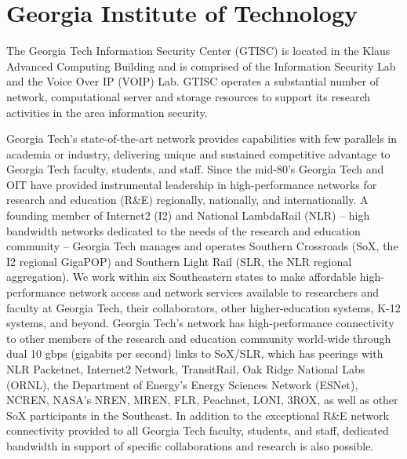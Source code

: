 \documentclass[letterpaper,11pt]{scrartcl}
\begin{document}
\section*{Georgia Institute of Technology}

The Georgia Tech Information Security Center (GTISC) is located in the Klaus
Advanced Computing Building and is comprised of the Information Security Lab
and the Voice Over IP (VOIP) Lab.  GTISC operates a substantial number of
network, computational server and storage resources  to support its research
activities in the area information security.

Georgia Tech's state-of-the-art network provides capabilities with few
parallels in academia or industry, delivering unique and sustained competitive
advantage to Georgia Tech faculty, students, and staff. Since the mid-80’s
Georgia Tech and OIT have provided instrumental leadership in high-performance
networks for research and education (R\&E) regionally, nationally, and
internationally.  A founding member of Internet2 (I2) and National LambdaRail
(NLR) – high bandwidth networks dedicated to the needs of the research and
education community – Georgia Tech manages and operates Southern Crossroads
(SoX, the I2 regional GigaPOP) and Southern Light Rail (SLR, the NLR regional
aggregation). We work within six Southeastern states to make affordable high-
performance network access and network services available to researchers and
faculty at Georgia Tech, their collaborators, other higher-education systems,
K-12 systems, and beyond.  Georgia Tech's network has high-performance
connectivity to other members of the research and education community
world-wide through dual 10 gbps (gigabits per second) links to SoX/SLR, which
has peerings with NLR Packetnet, Internet2 Network, TransitRail, Oak Ridge
National Labs (ORNL), the Department of Energy's Energy Sciences Network
(ESNet), NCREN, NASA's NREN, MREN, FLR, Peachnet, LONI, 3ROX, as well as other
SoX participants in the Southeast.  In addition to the exceptional R\&E
network connectivity provided to all Georgia Tech faculty, students, and
staff, dedicated bandwidth in support of specific collaborations and research
is also possible.
\end{document}
